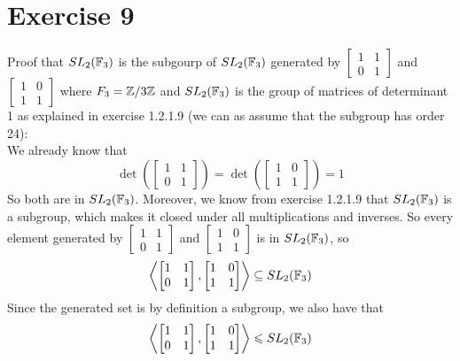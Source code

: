 \documentclass[12pt]{article}
\begin{document}
    \section*{Exercise 9}
    Proof that $SL_2(\mathbb{F}_3)$ is the subgourp of $SL_2(\mathbb{F}_3)$
    generated by $\begin{bmatrix} 1 & 1 \\ 0 & 1 \end{bmatrix}$
    and $\begin{bmatrix} 1 & 0 \\ 1 & 1 \end{bmatrix}$
    where $F_3 = \mathbb{Z}/3\mathbb{Z}$
    and $SL_2(\mathbb{F}_3)$ is the group of matrices of determinant 1
    as explained in exercise 1.2.1.9
    (we can as assume that the subgroup has order 24): \\
    We already know that
    \[\det\left(\begin{bmatrix} 1 & 1 \\ 0 & 1 \end{bmatrix}\right)
    = \det\left(\begin{bmatrix} 1 & 0 \\ 1 & 1 \end{bmatrix}\right)
    = 1\]
    So both are in $SL_2(\mathbb{F}_3)$.
    Moreover, we know from exercise 1.2.1.9 that 
    $SL_2(\mathbb{F}_3)$ is a subgroup,
    which makes it closed under all multiplications and inverses.
    So every element generated
    by $\begin{bmatrix} 1 & 1 \\ 0 & 1 \end{bmatrix}$
    and $\begin{bmatrix} 1 & 0 \\ 1 & 1 \end{bmatrix}$
    is in $SL_2(\mathbb{F}_3)$,
    so
    \[ \left\langle \begin{bmatrix} 1 & 1 \\ 0 & 1 \end{bmatrix},
    \begin{bmatrix} 1 & 0 \\ 1 & 1 \end{bmatrix} \right\rangle
    \subseteq SL_2(\mathbb{F}_3) \]
    Since the generated set is by definition a subgroup,
    we also have that 
    \[ \left\langle \begin{bmatrix} 1 & 1 \\ 0 & 1 \end{bmatrix},
    \begin{bmatrix} 1 & 0 \\ 1 & 1 \end{bmatrix} \right\rangle
    \leqslant SL_2(\mathbb{F}_3) \]
\end{document}
